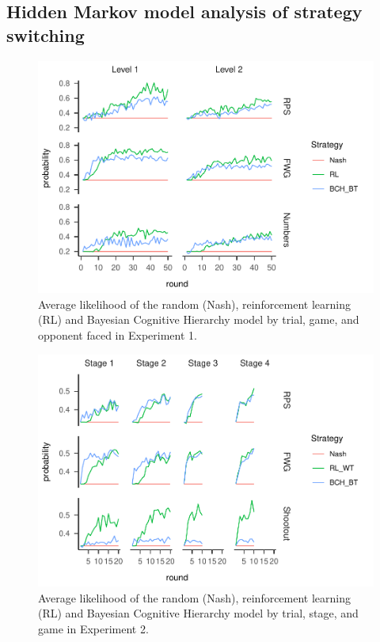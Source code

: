 \documentclass[smallextended]{svjour3}       %
\begin{document}
\hypertarget{hidden-markov-model-analysis-of-strategy-switching}{%
\subsection{Hidden Markov model analysis of strategy
switching}\label{hidden-markov-model-analysis-of-strategy-switching}}

\begin{figure}

{\centering \includegraphics[width=\textwidth]{CBB_v2_files/figure-latex/exp1-lik-by-tr-1} 

}

\caption{Average likelihood of the random (Nash), reinforcement learning (RL) and Bayesian Cognitive Hierarchy model by trial, game, and opponent faced in Experiment 1.}\label{fig:exp1-lik-by-tr}
\end{figure}

\begin{figure}

{\centering \includegraphics[width=\textwidth]{CBB_v2_files/figure-latex/exp2-lik-by-tr-1} 

}

\caption{Average likelihood of the random (Nash), reinforcement learning (RL) and Bayesian Cognitive Hierarchy model by trial, stage, and game in Experiment 2.}\label{fig:exp2-lik-by-tr}
\end{figure}
\end{document}
